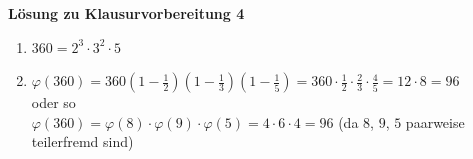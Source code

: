 \textbf{Lösung zu Klausurvorbereitung 4}

\begin{loesung}
\begin{enumerate}[label=\alph*)]
\item $360 = 2^3 \cdot 3^2 \cdot 5$
\item $\varphi(360) = 360 \left(1 - \frac{1}{2}\right)\left(1 - \frac{1}{3}\right)\left(1 - \frac{1}{5}\right) = 360 \cdot \frac{1}{2} \cdot \frac{2}{3} \cdot \frac{4}{5} = 12 \cdot 8 = 96$\\
oder so\\
$\varphi(360) = \varphi(8) \cdot \varphi(9) \cdot \varphi(5) = 4 \cdot 6 \cdot 4 = 96$ \quad (da $8$, $9$, $5$ paarweise teilerfremd sind)
\end{enumerate}
\end{loesung}
